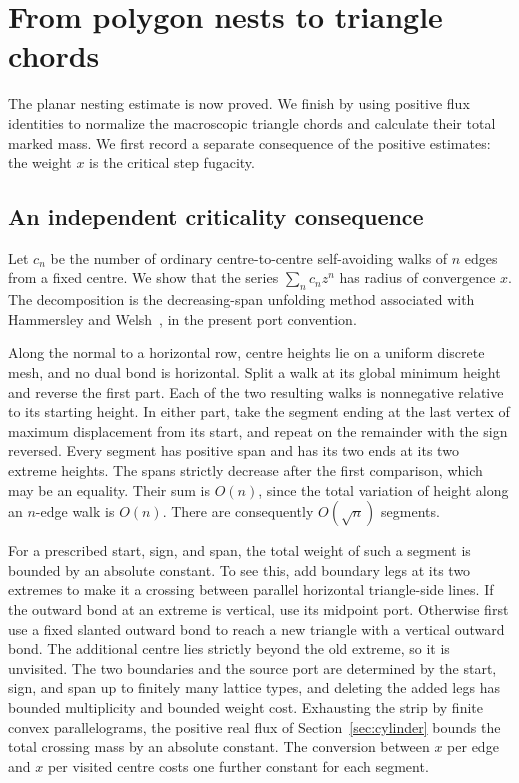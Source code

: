 \section{From polygon nests to triangle chords}\label{sec:chords}

The planar nesting estimate is now proved. We finish by using positive
flux identities to normalize the macroscopic triangle chords and calculate
their total marked mass. We first record a separate consequence of the
positive estimates: the weight $x$ is the critical step fugacity.

\subsection{An independent criticality consequence}

Let $c_n$ be the number of ordinary centre-to-centre self-avoiding walks
of $n$ edges from a fixed centre. We show that the series
$\sum_n c_n z^n$ has radius of convergence $x$. The decomposition is the
decreasing-span unfolding method associated with Hammersley and
Welsh~\cite{HammersleyWelsh1962}, in the present port convention.

Along the normal to a horizontal row, centre heights lie on a uniform
discrete mesh, and no dual bond is horizontal. Split a walk at its global
minimum height and reverse the first part. Each of the two resulting
walks is nonnegative relative to its starting height. In either part,
take the segment ending at the last vertex of maximum displacement from
its start, and repeat on the remainder with the sign reversed. Every
segment has positive span and has its two ends at its two extreme
heights. The spans strictly decrease after the first comparison, which
may be an equality. Their sum is $O(n)$, since the total variation of
height along an $n$-edge walk is $O(n)$. There are consequently
$O(\sqrt n)$ segments.

For a prescribed start, sign, and span, the total weight of such a
segment is bounded by an absolute constant. To see this, add boundary
legs at its two extremes to make it a crossing between parallel
horizontal triangle-side lines. If the outward bond at an extreme is
vertical, use its midpoint port. Otherwise first use a fixed slanted
outward bond to reach a new triangle with a vertical outward bond.
The additional centre lies strictly beyond the old extreme, so it is
unvisited. The two boundaries and the source port are determined by
the start, sign, and span up to finitely many lattice types, and deleting
the added legs has bounded multiplicity and bounded weight cost.
Exhausting the strip by finite convex parallelograms, the positive real
flux of Section~\ref{sec:cylinder} bounds the total crossing mass by an
absolute constant. The conversion between $x$ per edge and $x$ per
visited centre costs one further constant for each segment.

